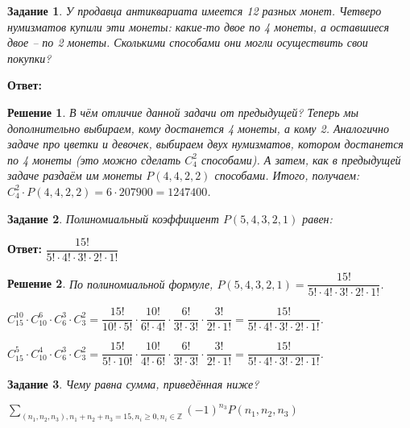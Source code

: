 \documentclass[a4paper,oneside]{memoir}
\newtheorem{task}{Задание}
\newtheorem{solution}{Решение}
\begin{document}
\hrulefill

\begin{task}
	У продавца антиквариата имеется 12 разных монет. Четверо нумизматов купили эти монеты: какие-то двое по 4 монеты, а оставшиеся двое -- по 2 монеты. Сколькими способами они могли осуществить свои покупки?
\end{task}

\textbf{Ответ:} $  $

\begin{solution}
	В чём отличие данной задачи от предыдущей? Теперь мы дополнительно выбираем, кому достанется 4 монеты, а кому 2. Аналогично задаче про цветки и девочек, выбираем двух нумизматов, котором достанется по 4 монеты (это можно сделать $ C_4^2 $ способами). А затем, как в предыдущей задаче раздаём им монеты $ P(4,4,2,2) $ способами. Итого, получаем: $ C_4^2 \cdot P(4,4,2,2) = 6 \cdot 207900 = 1247400 $.
\end{solution}

\hrulefill

\begin{task}
	Полиномиальный коэффициент $ P(5,4,3,2,1) $ равен:
\end{task}

\textbf{Ответ:} $ \dfrac{15!}{5!\cdot 4! \cdot 3! \cdot 2! \cdot 1!} $

\begin{solution}
	По полиномиальной формуле, $ P(5,4,3,2,1) = \dfrac{15!}{5!\cdot 4! \cdot 3! \cdot 2! \cdot 1!} $.
	
	
	$ 	C_{15}^{10} \cdot C_{10}^6 \cdot C_{6}^3 \cdot C_3^2 = \dfrac{15!}{10! \cdot 5!} \cdot \dfrac{10!}{6! \cdot 4!} \cdot \dfrac{6!}{3! \cdot 3!} \cdot \dfrac{3!}{2!\cdot 1!} = \dfrac{15!}{5! \cdot 4! \cdot 3! \cdot 2! \cdot 1!} $.
	
	$ C_{15}^{5} \cdot C_{10}^4 \cdot C_{6}^3 \cdot C_3^2 = \dfrac{15!}{5! \cdot 10!} \cdot \dfrac{10!}{4! \cdot 6!} \cdot \dfrac{6!}{3! \cdot 3!} \cdot \dfrac{3!}{2!\cdot 1!} = \dfrac{15!}{5! \cdot 4! \cdot 3! \cdot 2! \cdot 1!} $.
\end{solution}

\hrulefill

\begin{task}
	Чему равна сумма, приведённая ниже?
	
	$ \sum\limits_{(n_1,n_2,n_3), n_1+n_2+n_3=15, n_i \geq 0, n_i \in \mathbb{Z}} (-1)^{n_3} P(n_1,n_2,n_3) $ 
	
\end{task}
\end{document}
